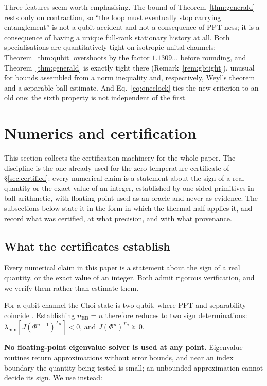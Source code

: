 \documentclass[11pt,a4paper]{article}
\theoremstyle{definition}
\theoremstyle{remark}
\newcommand{\nEB}{n_{\mathrm{EB}}}
\begin{document}
Three features seem worth emphasising. The bound of
Theorem~\ref{thm:generald} rests only on contraction, so ``the loop must eventually stop carrying entanglement'' is not
a qubit accident and not a consequence of PPT-ness; it is a consequence of
having a unique full-rank stationary history at all. Both specialisations are quantitatively tight on isotropic unital channels:
Theorem~\ref{thm:qubit} overshoots by the factor $1.1309\ldots$ before
rounding, and Theorem~\ref{thm:generald} is exactly tight there
(Remark~\ref{rem:gbtight}), unusual for bounds assembled from a norm
inequality and, respectively, Weyl's theorem and a separable-ball estimate. And Eq.~\eqref{eq:oneclock} ties the new criterion to
an old one: the sixth property is not independent of the first.

\section{Numerics and certification}\label{sec:numerics}

This section collects the certification machinery for the whole paper. The
discipline is the one already used for the zero-temperature certificate of
\S\ref{sec:certified}: every numerical claim is a statement about the sign of
a real quantity or the exact value of an integer, established by one-sided
primitives in ball arithmetic, with floating point used as an oracle and never
as evidence. The subsections below state it in the form in which the thermal
half applies it, and record what was certified, at what precision, and with
what provenance.



\subsection{What the certificates establish}\label{sec:onesided}

Every numerical claim in this paper is a statement about the sign of a real quantity, or the exact value of an integer. Both admit rigorous verification, and we verify them rather than estimate them.

For a qubit channel the Choi state is two-qubit, where PPT and separability coincide \cite{HSR2003}. Establishing $\nEB = n$ therefore reduces to two sign determinations: $\lambda_{\min}[J(\Phi^{n-1})^{T_R}] < 0$, and $J(\Phi^{n})^{T_R} \succeq 0$.

\textbf{No floating-point eigenvalue solver is used at any point.} Eigenvalue routines return approximations without error bounds, and near an index boundary the quantity being tested is small; an unbounded approximation cannot decide its sign. We use instead:
\end{document}
